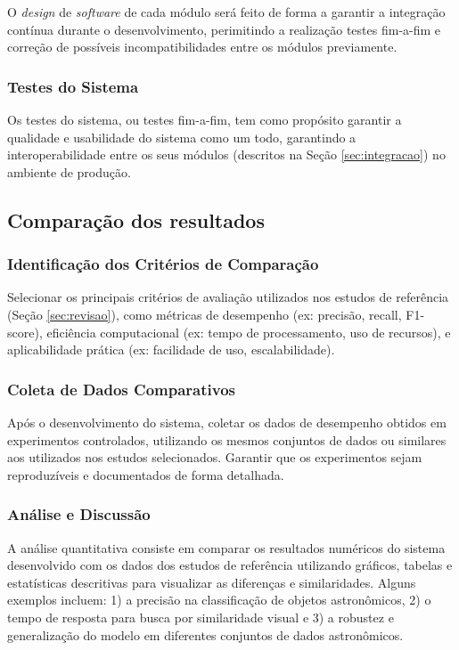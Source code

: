 \documentclass[a4,12pt]{horizon-theme}
\begin{document}
O \emph{design} de \emph{software} de cada módulo será feito de forma a garantir a integração contínua durante o desenvolvimento, perimitindo a realização testes fim-a-fim e correção de possíveis incompatibilidades entre os módulos previamente.




\subsubsection{Testes do Sistema}
\label{sec:validacao_final}
Os testes do sistema, ou testes fim-a-fim, tem como propósito garantir a qualidade e usabilidade do sistema como um todo, garantindo a interoperabilidade entre os seus módulos (descritos na Seção \ref{sec:integracao}) no ambiente de produção.



\subsection{Comparação dos resultados}
\label{sec:comparacao}
\subsubsection{Identificação dos Critérios de Comparação}
Selecionar os principais critérios de avaliação utilizados nos estudos de referência (Seção \ref{sec:revisao}), como métricas de desempenho (ex: precisão, recall, F1-score), eficiência computacional (ex: tempo de processamento, uso de recursos), e aplicabilidade prática (ex: facilidade de uso, escalabilidade).


\subsubsection{Coleta de Dados Comparativos}
Após o desenvolvimento do sistema, coletar os dados de desempenho obtidos em experimentos controlados, utilizando os mesmos conjuntos de dados ou similares aos utilizados nos estudos selecionados. Garantir que os experimentos sejam reproduzíveis e documentados de forma detalhada.


\subsubsection{Análise e Discussão}
A análise quantitativa consiste em comparar os resultados numéricos do sistema desenvolvido com os dados dos estudos de referência utilizando gráficos, tabelas e estatísticas descritivas para visualizar as diferenças e similaridades. Alguns exemplos incluem: 1) a precisão na classificação de objetos astronômicos, 2) o tempo de resposta para busca por similaridade visual e 3) a robustez e generalização do modelo em diferentes conjuntos de dados astronômicos.
\end{document}
